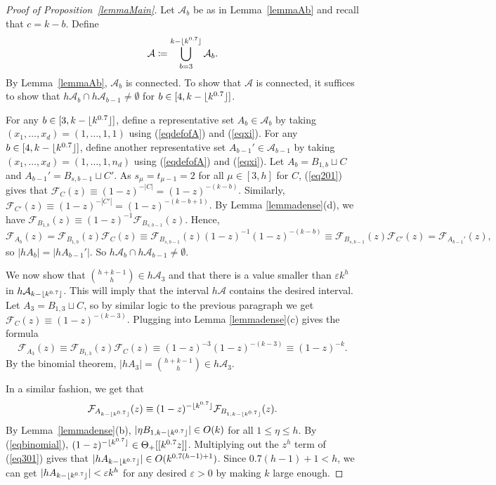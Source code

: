 \documentclass{daj}
\theoremstyle{definition}
\theoremstyle{remark}
\numberwithin{equation}{section}
\numberwithin{theorem}{section}
\newcommand{\cala}{\mathcal{A}}
\newcommand{\calf}{\mathcal{F}}
\DeclarePairedDelimiter{\floor}{\lfloor}{\rfloor}
\begin{document}
\begin{proof}[Proof of Proposition~\ref{lemmaMain}]
Let $\cala_b$ be as in Lemma~\ref{lemmaAb} and recall that $c = k-b$. Define \[\cala \coloneq  \bigcup_{b=3}^{k-\floor{k^{0.7}}} \cala_b.\] By Lemma~\ref{lemmaAb}, $\cala_b$ is connected. To show that $\cala$ is connected, it suffices to show that $h\cala_{b} \cap h\cala_{b-1} \neq \emptyset$ for $b \in [4,k-\floor{k^{0.7}}]$. 

For any $b \in [3,k-\floor{k^{0.7}}]$, define a representative set $A_b \in \cala_b$ by taking $(x_1,\ldots,x_d) = (1,\ldots,1,1)$ using (\ref{eqdefofA}) and (\ref{eqxi}). For any $b \in [4,k-\floor{k^{0.7}}]$, define another representative set $A_{b-1}' \in \cala_{b-1}$ by taking $(x_1,\ldots,x_d) = (1,\ldots,1,n_d)$ using (\ref{eqdefofA}) and (\ref{eqxi}). Let $A_b = B_{1,b} \sqcup C$ and $A_{b-1}' = B_{s,b-1} \sqcup C'$. As ${s_\mu = t_{\mu-1} = 2}$ for all $\mu \in [3,h]$ for $C$, (\ref{eq201}) gives that $\calf_C(z) \equiv (1-z)^{-|C|} = (1-z)^{-(k-b)}$. Similarly, $\calf_{C'}(z) \equiv (1-z)^{-|C'|} = (1-z)^{-(k-b+1)}$. By Lemma \ref{lemmadense}(d), we have $\calf_{B_{1,b}}(z) \equiv (1-z)^{-1} \calf_{B_{s,b-1}}(z)$. Hence, \[\calf_{A_b}(z) = \calf_{B_{1,b}}(z) \calf_C(z) \equiv  \calf_{B_{s,b-1}}(z)(1-z)^{-1}(1-z)^{-(k-b)} \equiv \calf_{B_{s,b-1}}(z) \calf_{C'}(z)= \calf_{A_{b-1}'}(z),\] so $|hA_b| = |hA_{b-1}'|$. So $h\cala_{b} \cap h\cala_{b-1} \neq \emptyset$.

We now show that $\binom{h+k-1}{h} \in h\cala_3$ and that there is a value smaller than $\varepsilon k^h$ in $h\cala_{k-\floor{k^{0.7}}}$. This will imply that the interval $h\cala$ contains the desired interval. Let $A_3 = B_{1,3} \sqcup C$, so by similar logic to the previous paragraph we get $\calf_C(z) \equiv (1-z)^{-(k-3)}$. Plugging into Lemma \ref{lemmadense}(c) gives the formula \[\calf_{A_3}(z) \equiv \calf_{B_{1,3}}(z) \calf_C(z) \equiv (1-z)^{-3}(1-z)^{-(k-3)} \equiv (1-z)^{-k}.\] By the binomial theorem, $|hA_3| = \binom{h+k-1}{h} \in h\cala_3$. 

In a similar fashion, we get that \begin{equation}\label{eq301}
\calf_{A_{k-\floor{k^{0.7}}}}(z) \equiv (1-z)^{-\floor{k^{0.7}}}\calf_{B_{1,k-\floor{k^{0.7}}}}(z).\end{equation} By Lemma~\ref{lemmadense}(b), $|\eta B_{1,{k-\floor{k^{0.7}}}}| \in O(k)$ for all $1 \leq \eta \leq h$. By (\ref{eqbinomial}), $(1-z)^{-\floor{k^{0.7}}} \in \Theta_+[[k^{0.7}z]]$. Multiplying out the $z^h$ term of (\ref{eq301}) gives that $|hA_{k-\floor{k^{0.7}}}| \in O(k^{0.7(h-1)+1})$. Since $0.7(h-1)+1 < h$, we can get $|hA_{k-\floor{k^{0.7}}}| < \varepsilon k^h$ for any desired $\varepsilon >0$ by making $k$ large enough.
\end{proof}
\end{document}
